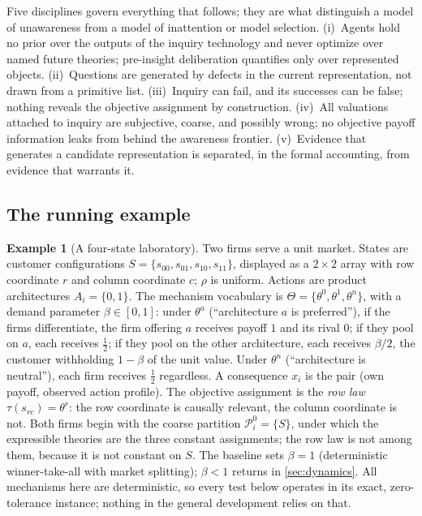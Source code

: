 \documentclass[11pt]{article}
\theoremstyle{definition}
\newtheorem{example}{Example}
\begin{document}
Five disciplines govern everything that follows; they are what distinguish a
model of unawareness from a model of inattention or model selection.
(i)~Agents hold no prior over the outputs of the inquiry technology and never
optimize over named future theories; pre-insight deliberation quantifies only
over represented objects.  (ii)~Questions are generated by defects in the
current representation, not drawn from a primitive list.  (iii)~Inquiry can
fail, and its successes can be false; nothing reveals the objective
assignment by construction.  (iv)~All valuations attached to inquiry are
subjective, coarse, and possibly wrong; no objective payoff information
leaks from behind the awareness frontier.  (v)~Evidence that generates a
candidate representation is separated, in the formal accounting, from
evidence that warrants it.

\subsection{The running example}

\begin{example}[A four-state laboratory]
\label{ex:setup}
Two firms serve a unit market.  States are customer configurations
$S=\{s_{00},s_{01},s_{10},s_{11}\}$, displayed as a $2\times2$ array with row
coordinate $r$ and column coordinate $c$; $\rho$ is uniform.  Actions are
product architectures $A_i=\{0,1\}$.  The mechanism vocabulary is
$\Theta=\{\theta^0,\theta^1,\theta^n\}$, with a demand parameter
$\beta\in[0,1]$: under $\theta^a$ (``architecture $a$ is preferred''), if the
firms differentiate, the firm offering $a$ receives payoff $1$ and its rival
$0$; if they pool on $a$, each receives $\tfrac12$; if they pool on the other
architecture, each receives $\beta/2$, the customer withholding $1-\beta$ of
the unit value.  Under $\theta^n$ (``architecture is neutral''), each firm
receives $\tfrac12$ regardless.  A consequence $x_i$ is the pair (own payoff,
observed action profile).  The objective assignment is the \emph{row law}
$\tau(s_{rc})=\theta^{r}$: the row coordinate is causally relevant, the
column coordinate is not.  Both firms begin with the coarse partition
$\mathcal P_i^0=\{S\}$, under which the expressible theories are the three
constant assignments; the row law is not among them, because it is not
constant on $S$.  The baseline sets $\beta=1$ (deterministic winner-take-all
with market splitting); $\beta<1$ returns in \cref{sec:dynamics}.  All
mechanisms here are deterministic, so every test below operates in its exact,
zero-tolerance instance; nothing in the general development relies on that.
\end{example}
\end{document}
